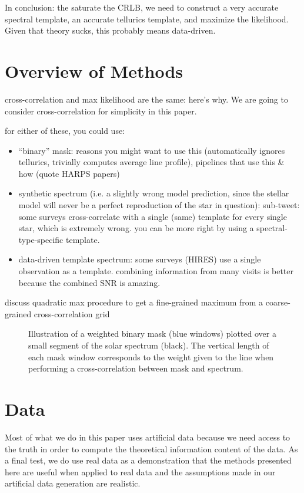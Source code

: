 \documentclass[modern]{aastex61}
\begin{document}
In conclusion: the saturate the CRLB, we need to construct a very accurate spectral template, an accurate tellurics template, and maximize the likelihood. Given that theory sucks, this probably means data-driven.

\section{Overview of Methods}
\label{s:methods}

cross-correlation and max likelihood are the same: here's why. We are going to consider cross-correlation for simplicity in this paper.

for either of these, you could use:
\begin{itemize}
\item ``binary'' mask: reasons you might want to use this (automatically ignores tellurics, trivially computes average line profile), pipelines that use this \& how (quote HARPS papers)
\item synthetic spectrum (i.e. a slightly wrong model prediction, since the stellar model will never be a perfect reproduction of the star in question): sub-tweet: some surveys cross-correlate with a single (same) template for every single star, which is extremely wrong. you can be more right by using a spectral-type-specific template.
\item data-driven template spectrum: some surveys (HIRES) use a single observation as a template. combining information from many visits is better because the combined SNR is amazing.
\end{itemize}


discuss quadratic max procedure to get a fine-grained maximum from a coarse-grained cross-correlation grid


\begin{figure}
\centering
\caption{Illustration of a weighted binary mask (blue windows) plotted over a small segment of the solar spectrum (black). The vertical length of each mask window corresponds to the weight given to the line when performing a cross-correlation between mask and spectrum.}
\label{fig:binarymask}
\end{figure}

\section{Data}
\label{s:data}

Most of what we do in this paper uses artificial data because we need access to the truth in order to compute the theoretical information content of the data. As a final test, we do use real data as a demonstration that the methods presented here are useful when applied to real data and the assumptions made in our artificial data generation are realistic.
\end{document}

